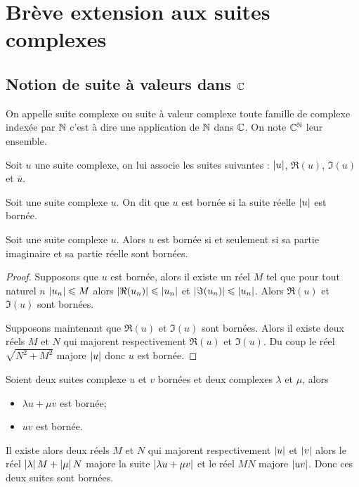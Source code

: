 \section{Brève extension aux suites complexes}

\subsection{Notion de suite à valeurs dans \(\mathbb{C}\)}

\begin{defdef}
  On appelle suite complexe ou suite à valeur complexe toute famille de complexe indexée par \(\mathbb{N}\) c'est à dire une application de \(\mathbb{N}\) dans \(\mathbb{C}\). On note \(\mathbb{C}^{\mathbb{N}}\) leur ensemble.
\end{defdef}
\begin{defdef}
  Soit \(u\) une suite complexe, on lui associe les suites suivantes : \(\left\lvert u\right\rvert\), \(\Re(u)\), \(\Im(u)\) et \(\bar{u}\).
\end{defdef}
\begin{defdef}
  Soit une suite complexe \(u\). On dit que \(u\) est bornée si la suite réelle \(\left\lvert u\right\rvert\) est bornée.
\end{defdef}

\begin{prop}
  Soit une suite complexe \(u\). Alors \(u\) est bornée si et seulement si sa partie imaginaire et sa partie réelle sont bornées.
\end{prop}
\begin{proof}
  Supposons que \(u\) est bornée, alors il existe un réel \(M\) tel que pour tout naturel \(n\) \(\left\lvert u_n\right\rvert \leqslant M\) alors \(\left\lvert\Re(u_n)\right\rvert \leqslant \left\lvert u_n\right\rvert\) et \(\left\lvert\Im(u_n)\right\rvert \leqslant \left\lvert u_n\right\rvert\). Alors \(\Re(u)\) et \(\Im(u)\) sont bornées.

Supposons maintenant que \(\Re(u)\) et \(\Im(u)\) sont bornées. Alors il existe deux réels \(M\) et \(N\) qui majorent respectivement \(\Re(u)\) et \(\Im(u)\). Du coup le réel \(\sqrt{N^2+M^2}\) majore \(\left\lvert u\right\rvert\) donc \(u\) est bornée.
\end{proof}

\begin{prop}
  Soient deux suites complexe \(u\) et \(v\) bornées et deux complexes \(\lambda\) et \(\mu\), alors
  \begin{itemize}
  \item \(\lambda u + \mu v\) est bornée;
  \item \(uv\) est bornée.
  \end{itemize}
Il existe alors deux réels \(M\) et \(N\) qui majorent respectivement \(\left\lvert u\right\rvert\) et \(\left\lvert v\right\rvert\) alors le réel \(\left\lvert\lambda\right\rvert M+\left\lvert\mu\right\rvert N\) majore la suite \(\left\lvert\lambda u + \mu v\right\rvert\) et le réel \(MN\) majore \(\left\lvert uv\right\rvert\). Donc ces deux suites sont bornées.
\end{prop}

